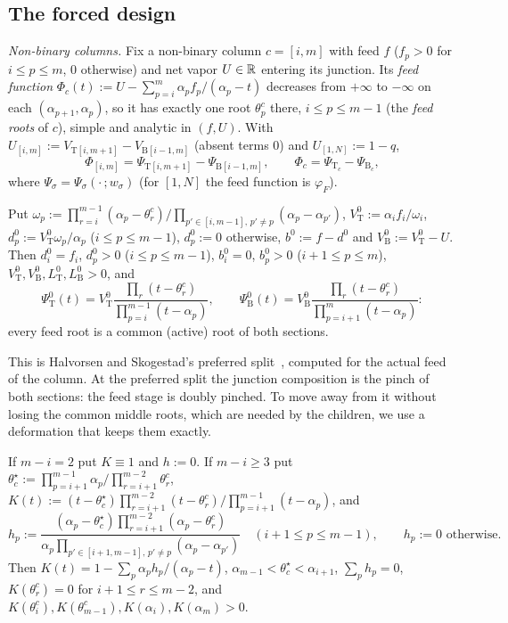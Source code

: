 \documentclass[11pt,a4paper]{report}
\newcommand{\Ts}{\mathrm T}
\newcommand{\Bs}{\mathrm B}
\begin{document}
\subsection{The forced design}\label{sec:design}

\emph{Non-binary columns.} Fix a non-binary column \(c=[i,m]\) with feed \(f\) (\(f_p>0\) for \(i\le p\le m\), \(0\) otherwise) and net
vapor \(U\in\mathbb{R}\) entering its junction. Its \emph{feed function} \(\Phi_c(t):=U-\sum_{p=i}^m\alpha_pf_p/(\alpha_p-t)\) decreases from
\(+\infty\) to \(-\infty\) on each \((\alpha_{p+1},\alpha_p)\), so it has exactly one root \(\theta^c_p\) there, \(i\le p\le m-1\) (the
\emph{feed roots} of \(c\)), simple and analytic in \((f,U)\). With \(U_{[i,m]}:=V_{\Ts[i,m+1]}-V_{\Bs[i-1,m]}\) (absent terms \(0\))
and \(U_{[1,N]}:=1-q\),
\begin{equation}\label{eq:feedfunction}
\Phi_{[i,m]}=\Psi_{\Ts[i,m+1]}-\Psi_{\Bs[i-1,m]},\qquad\Phi_c=\Psi_{\Ts_c}-\Psi_{\Bs_c},
\end{equation}
where \(\Psi_\sigma=\Psi_\sigma(\cdot\,;w_\sigma)\) (for \([1,N]\) the feed function is \(\varphi_F\)).

\begin{lemma}\label{lem:preferred}
Put \(\omega_p:=\prod_{r=i}^{m-1}(\alpha_p-\theta^c_r)\big/\prod_{p'\in[i,m-1],\,p'\ne p}(\alpha_p-\alpha_{p'})\),
\(V^0_\Ts:=\alpha_if_i/\omega_i\), \(d^0_p:=V^0_\Ts\omega_p/\alpha_p\) (\(i\le p\le m-1\)), \(d^0_p:=0\) otherwise, \(b^0:=f-d^0\) and
\(V^0_\Bs:=V^0_\Ts-U\). Then \(d^0_i=f_i\), \(d^0_p>0\) (\(i\le p\le m-1\)), \(b^0_i=0\), \(b^0_p>0\) (\(i+1\le p\le m\)),
\(V^0_\Ts,V^0_\Bs,L^0_\Ts,L^0_\Bs>0\), and
\[\Psi^0_\Ts(t)=V^0_\Ts\frac{\prod_r(t-\theta^c_r)}{\prod_{p=i}^{m-1}(t-\alpha_p)},\qquad
\Psi^0_\Bs(t)=V^0_\Bs\frac{\prod_r(t-\theta^c_r)}{\prod_{p=i+1}^m(t-\alpha_p)}:\]
every feed root is a common (active) root of both sections.
\end{lemma}

This is Halvorsen and Skogestad's preferred split~\autocite{HS2,HS3}, computed for the actual feed of the column. At the
preferred split the junction composition is the pinch of both sections: the feed stage is doubly pinched. To move away
from it without losing the common middle roots, which are needed by the children, we use a deformation that keeps them
exactly.

\begin{lemma}\label{lem:slack}
If \(m-i=2\) put \(K\equiv1\) and \(h:=0\). If \(m-i\ge3\) put
\(\theta^\star_c:=\prod_{p=i+1}^{m-1}\alpha_p\big/\prod_{r=i+1}^{m-2}\theta^c_r\),
\(K(t):=(t-\theta^\star_c)\prod_{r=i+1}^{m-2}(t-\theta^c_r)\big/\prod_{p=i+1}^{m-1}(t-\alpha_p)\), and
\[h_p:=\frac{(\alpha_p-\theta^\star_c)\prod_{r=i+1}^{m-2}(\alpha_p-\theta^c_r)}{\alpha_p\prod_{p'\in[i+1,m-1],\,p'\ne p}(\alpha_p-\alpha_{p'})}\quad(i+1\le p\le m-1),\qquad h_p:=0\text{ otherwise}.\]
Then \(K(t)=1-\sum_p\alpha_ph_p/(\alpha_p-t)\), \(\alpha_{m-1}<\theta^\star_c<\alpha_{i+1}\), \(\sum_ph_p=0\), \(K(\theta^c_r)=0\) for
\(i+1\le r\le m-2\), and \(K(\theta^c_i),K(\theta^c_{m-1}),K(\alpha_i),K(\alpha_m)>0\).
\end{lemma}
\end{document}
